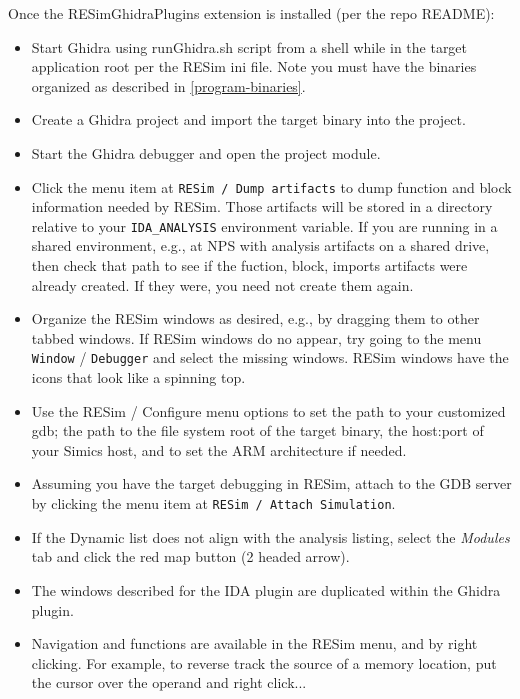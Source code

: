 \documentclass[titlepage]{article}
\begin{document}
Once the RESimGhidraPlugins extension is installed (per the repo README): 
\begin{itemize}
\item Start Ghidra using runGhidra.sh script from a shell while in the target application root 
per the RESim ini file.  Note you must have the binaries organized as described in \ref{program-binaries}.

\item Create a Ghidra project and import the target binary into the project.

\item Start the Ghidra debugger and open the project module.

\item Click the menu item at {\tt RESim / Dump artifacts}  to dump function and block information
needed by RESim.  Those artifacts will be stored in a directory relative to your {\tt IDA\_ANALYSIS} environment variable.
If you are running in a shared environment, e.g., at NPS with analysis artifacts on a shared drive, then 
check that path to see if the fuction, block, imports artifacts were already created.  If they were, you need not create them again.

\item Organize the RESim windows
as desired, e.g., by dragging them to other tabbed windows.  If RESim windows do no appear, try going to the menu
{\tt Window} / {\tt Debugger} and select the missing windows.  RESim windows have the icons that look like a spinning top.

\item Use the RESim / Configure menu options to set the path to your customized gdb; the path to
the file system root of the target binary, the host:port of your Simics host, and to set the ARM architecture if needed.

\item Assuming you have the target debugging in RESim, attach to the GDB server by clicking the menu item at {\tt RESim / Attach Simulation}.

\item If the Dynamic list does not align with the analysis listing, select the \textit{Modules} tab and click the red map button (2 headed arrow).

\item The windows described for the IDA plugin are duplicated within the Ghidra plugin.

\item Navigation and functions are available in the RESim menu, and by right clicking.  For example, to reverse track
the source of a memory location, put the cursor over the operand and right click...


\end{itemize}
\end{document}
